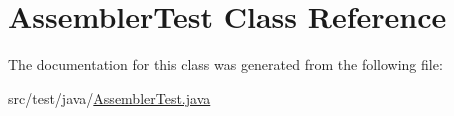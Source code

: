 \hypertarget{class_assembler_test}{}\section{Assembler\+Test Class Reference}
\label{class_assembler_test}


The documentation for this class was generated from the following file\+:\begin{DoxyCompactItemize}
\item 
src/test/java/\mbox{\hyperlink{_assembler_test_8java}{Assembler\+Test.\+java}}\end{DoxyCompactItemize}
